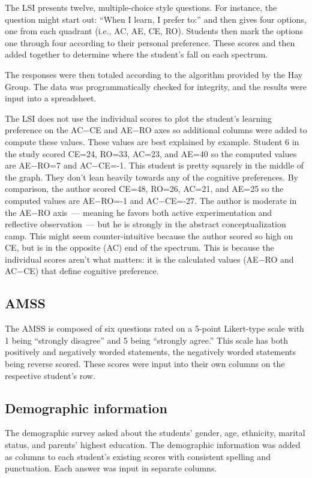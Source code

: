 The LSI presents twelve, multiple-choice style questions. For instance, the question might start out: ``When I learn, I prefer to:'' and then gives four options, one from each quadrant (i.e., AC, AE, CE, RO). Students then mark the options one through four according to their personal preference. These scores and then added together to determine where the student's fall on each spectrum.

The responses were then totaled according to the algorithm provided by the Hay Group. The data was programmatically checked for integrity, and the results were input into a spreadsheet.

The LSI does not use the individual scores to plot the student's learning preference on the AC$-$CE and AE$-$RO axes so additional columns were added to compute these values. These values are best explained by example. Student 6 in the study scored CE=24, RO=33, AC=23, and AE=40 so the computed values are AE$-$RO=7 and AC$-$CE=-1. This student is pretty squarely in the middle of the graph. They don't lean heavily towards any of the cognitive preferences. By comparison, the author scored CE=48, RO=26, AC=21, and AE=25 so the computed values are AE$-$RO=-1 and AC$-$CE=-27. The author is moderate in the AE$-$RO axis~--- meaning he favors both active experimentation and reflective observation~--- but he is strongly in the abstract conceptualization camp. This might seem counter-intuitive because the author scored so high on CE, but is in the opposite (AC) end of the spectrum. This is because the individual scores aren't what matters: it is the calculated values (AE$-$RO and AC$-$CE) that define cognitive preference.

\subsection{AMSS}
The AMSS is composed of six questions rated on a 5-point Likert-type scale with 1 being ``strongly disagree'' and 5 being ``strongly agree.'' This scale has both positively and negatively worded statements, the negatively worded statements being reverse scored. These scores were input into their own columns on the respective student's row.

\subsection{Demographic information}
The demographic survey asked about the students' gender, age, ethnicity, marital status, and parents' highest education. The demographic information was added as columns to each student's existing scores with consistent spelling and punctuation. Each answer was input in separate columns.

